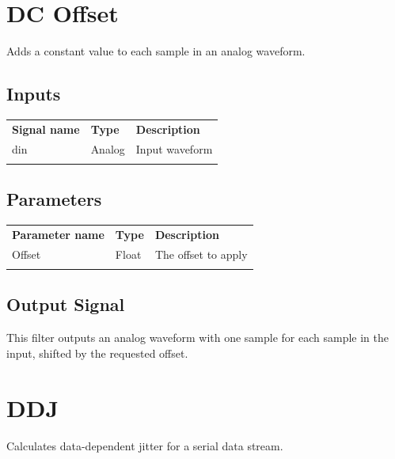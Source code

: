 \pagebreak
\section{DC Offset}

Adds a constant value to each sample in an analog waveform.

\subsection{Inputs}

\begin{tabularx}{16cm}{llX}
\thickhline
\textbf{Signal name} & \textbf{Type} & \textbf{Description} \\
\thickhline
din & Analog & Input waveform \\
\thickhline
\end{tabularx}

\subsection{Parameters}

\begin{tabularx}{16cm}{llX}
\thickhline
\textbf{Parameter name} & \textbf{Type} & \textbf{Description} \\
\thickhline
Offset & Float & The offset to apply \\
\thickhline
\end{tabularx}

\subsection{Output Signal}

This filter outputs an analog waveform with one sample for each sample in the input, shifted by the requested offset.

\pagebreak
\section{DDJ}

Calculates data-dependent jitter for a serial data stream.

\pagebreak
